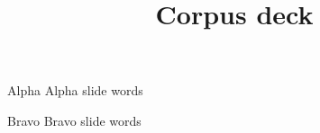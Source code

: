 \documentclass{beamer}
\title{Corpus deck}
\begin{document}
\begin{frame}{Alpha}
  Alpha slide words
\end{frame}
\begin{frame}{Bravo}
  Bravo slide words
\end{frame}
\begin{frame}
\end{frame}
\end{document}
